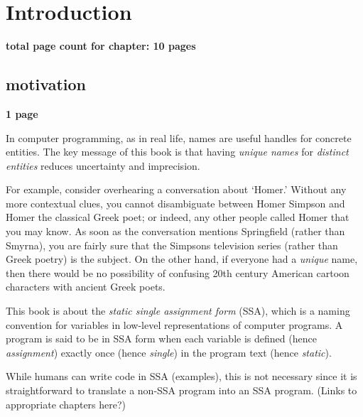 \chapter{Introduction }

\textbf{total page count for chapter: 10 pages}


\section{motivation}

\textbf{1 page}


In computer programming, as in real life, 
names are useful handles for concrete entities.
The key message of this book is that
having \textit{unique names} for
\textit{distinct entities}
reduces uncertainty and imprecision.

For example, consider overhearing a conversation
about `Homer.' Without any more contextual clues, you
cannot disambiguate between Homer Simpson and Homer the
classical Greek poet; or indeed, any other people
called Homer that you may know.
As soon as the conversation mentions Springfield
(rather than Smyrna), you are fairly sure that the
Simpsons television series (rather than Greek poetry)
is the subject.
On the other hand, if everyone had a \textit{unique} name,
then there would be no possibility of confusing 20th century
American cartoon characters with ancient Greek poets.


This book is about the \textit{static single assignment form} (SSA),
which is a naming convention for variables in low-level representations
of computer programs.
A program is said to be in SSA form when each variable is defined (hence
\textit{assignment})
exactly once (hence \textit{single}) in the program text
(hence \textit{static}).

While humans can write code in SSA (examples), this is not necessary
since it is straightforward to translate a non-SSA program into an SSA
program. (Links to appropriate chapters here?)

